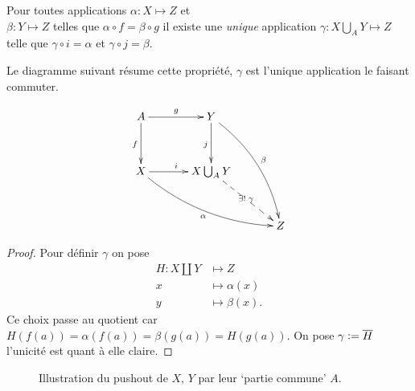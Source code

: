 \documentclass[main.tex]{subfiles}
\begin{document}
	\begin{prop}
		Pour toutes applications $\alpha : X \longmapsto Z$ et\\
		$\beta : Y \longmapsto Z$ telles que $\alpha \circ f = \beta \circ g$ il existe une \emph{unique} application  $\gamma : X \bigcup_A Y \longmapsto Z$ telle que $\gamma \circ i = \alpha$ et  $\gamma \circ j = \beta$.

		\begin{minipage}{0.5\textwidth}
			Le diagramme suivant résume cette propriété, $\gamma$ est l'unique application le faisant commuter.
		\end{minipage}
		\hfill
		\begin{minipage}{0.5\textwidth}
			\[
			\xymatrix@R=1.2cm@C=1.2cm{
			 A \ar[r]^{g}      \ar[d]_{f}         & Y \ar[d]_{j} \ar@/^1pc/[rdd]^{\beta}   \\
			 X \ar[r]^{i} \ar@/_1pc/[rrd]_{\alpha} & X\bigcup_A Y \ar@{-->}[rd]|{\exists! \; \gamma}             \\
							      &                                   & Z 
			}
	\]	
		\end{minipage}
	\end{prop}
	\begin{proof}
		Pour définir $\gamma$ on pose  
		\begin{align*}
			H : X \coprod Y &\longmapsto Z \\
			x &\longmapsto \alpha(x) \\
			y &\longmapsto \beta(x)
		.\end{align*}
		Ce choix passe au quotient car $H(f(a)) = \alpha(f(a)) = \beta(g(a)) = H(g(a))$. On pose  $\gamma \vcentcolon= \overline{H}$ l'unicité est quant à elle claire.
	\end{proof}
	
	\begin{figure}[ht]
		\centering
		\def\svgwidth{0.5\textwidth}
		
		\caption{Illustration du pushout de $X$, $Y$ par leur `partie commune' $A$.}
	\end{figure}
\end{document}
